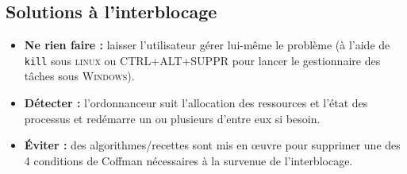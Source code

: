 \documentclass[10pt,firamath,cours]{nsi}
\begin{document}
\subsection{Solutions à l'interblocage}
\begin{itemize}
	\item 	\textbf{Ne rien faire :} laisser l'utilisateur gérer lui-même le problème (à l'aide de \texttt{kill} sous \textsc{linux} ou CTRL+ALT+SUPPR pour lancer le gestionnaire des tâches sous \textsc{Windows}).
	\item 	\textbf{Détecter :}  l'ordonnanceur suit l'allocation des ressources et l'état des processus et redémarre un ou plusieurs d'entre eux si besoin.
    \item \textbf{\'Eviter :} des algorithmes/recettes sont mis en œuvre pour supprimer une des 4 conditions de Coffman nécessaires à la survenue de l'interblocage.
\end{itemize}
\end{document}
